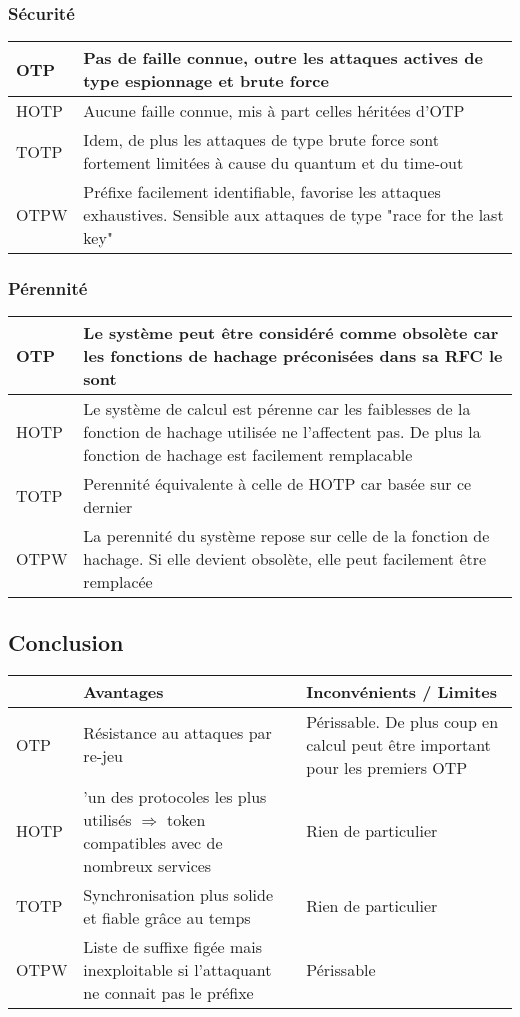 \subsubsection{Sécurité}

	\begin{tabular}{| p{3cm} | p{12cm}}
		\hline
		OTP & Pas de faille connue, outre les attaques actives de type
		espionnage et brute force \\
		\hline
		HOTP & Aucune faille connue, mis à part celles héritées d'OTP \\
		\hline
		TOTP & Idem, de plus les attaques de type brute force sont fortement
		limitées à cause du quantum et du time-out \\
		\hline
		OTPW & Préfixe facilement identifiable, favorise les attaques
		exhaustives. Sensible aux attaques de type "race for the last key" \\
		\hline
	\end{tabular}

\subsubsection{Pérennité}

	\begin{tabular}{| p{3cm} | p{12cm}}
		\hline
		OTP & Le système peut être considéré comme obsolète car les fonctions
		de hachage préconisées dans sa RFC le sont \\
		\hline
		HOTP & Le système de calcul est	pérenne car les faiblesses de la
		fonction de hachage utilisée ne l'affectent pas. De plus la fonction
		de hachage est facilement remplacable \\
		\hline
		TOTP & Perennité équivalente à celle de HOTP car basée sur ce dernier
		\\
		\hline
		OTPW & La perennité du système repose sur celle de la fonction de
		hachage. Si elle devient obsolète, elle peut facilement être remplacée
		\\
		\hline
	\end{tabular}

\subsection{Conclusion}

	\begin{tabular}{| p{3cm} | p{6cm} | p{6cm}}
		\hline
		& \cellcolor{gray} Avantages & \cellcolor{gray} Inconvénients /
		Limites \\
		\hline
		OTP & Résistance au attaques par re-jeu & Périssable. De plus coup en
		calcul peut être important pour les premiers OTP \\
		\hline
		HOTP &
		'un des protocoles les plus utilisés $\Rightarrow$ token compatibles
		avec de nombreux services & Rien de particulier \\
		\hline
		TOTP & Synchronisation plus solide et fiable grâce au temps & Rien de
		particulier \\
		\hline
		OTPW & Liste de suffixe figée mais inexploitable si l'attaquant ne
		connait pas le préfixe & Périssable \\
		\hline
	\end{tabular}

